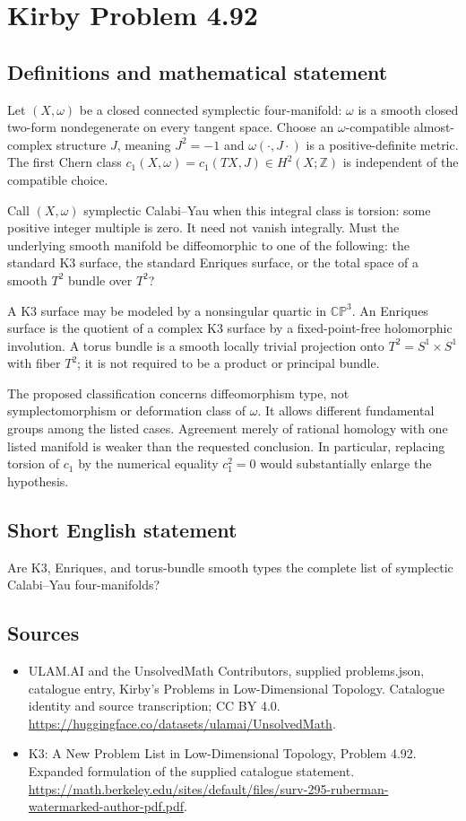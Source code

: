 \documentclass[11pt,a4paper]{article}
\begin{document}
\section*{Kirby Problem 4.92}\label{statement}

\subsection{Definitions and mathematical statement}
Let $(X,\omega)$ be a closed connected symplectic four-manifold: $\omega$ is a smooth closed two-form nondegenerate on every tangent space. Choose an $\omega$-compatible almost-complex structure $J$, meaning $J^2=-1$ and $\omega(\cdot,J\cdot)$ is a positive-definite metric. The first Chern class $c_1(X,\omega)=c_1(TX,J)\in H^2(X;\mathbb Z)$ is independent of the compatible choice.

Call $(X,\omega)$ symplectic Calabi--Yau when this integral class is torsion: some positive integer multiple is zero. It need not vanish integrally. Must the underlying smooth manifold be diffeomorphic to one of the following: the standard K3 surface, the standard Enriques surface, or the total space of a smooth $T^2$ bundle over $T^2$?

A K3 surface may be modeled by a nonsingular quartic in $\mathbb{CP}^3$. An Enriques surface is the quotient of a complex K3 surface by a fixed-point-free holomorphic involution. A torus bundle is a smooth locally trivial projection onto $T^2=S^1\times S^1$ with fiber $T^2$; it is not required to be a product or principal bundle.

The proposed classification concerns diffeomorphism type, not symplectomorphism or deformation class of $\omega$. It allows different fundamental groups among the listed cases. Agreement merely of rational homology with one listed manifold is weaker than the requested conclusion. In particular, replacing torsion of $c_1$ by the numerical equality $c_1^2=0$ would substantially enlarge the hypothesis.
\subsection{Short English statement}
Are K3, Enriques, and torus-bundle smooth types the complete list of symplectic Calabi–Yau four-manifolds?
\subsection{Sources}
\begin{itemize}
\item[S1] ULAM.AI and the UnsolvedMath Contributors, supplied problems.json, catalogue entry, Kirby's Problems in Low-Dimensional Topology. Catalogue identity and source transcription; CC BY 4.0.
\url{https://huggingface.co/datasets/ulamai/UnsolvedMath}.
\item[S2] K3: A New Problem List in Low-Dimensional Topology, Problem 4.92. Expanded formulation of the supplied catalogue statement.
\url{https://math.berkeley.edu/sites/default/files/surv-295-ruberman-watermarked-author-pdf.pdf}.
\end{itemize}
\end{document}
